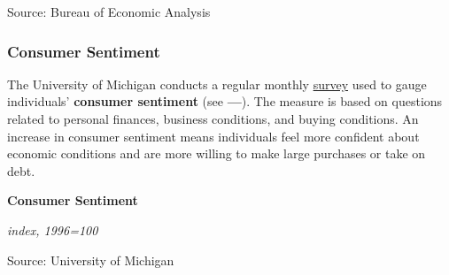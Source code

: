 \documentclass{report}
\makeatletter
\newcommand{\tbllink}[1]{\href{https://raw.githubusercontent.com/bdecon/US-chartbook/master/chartbook/data/#1}{\faTable}}
\newcommand*\short[1]{\expandafter\@gobbletwo\number\numexpr#1\relax}
\newcommand{\dateaxisticks}{
		date coordinates in=x, axis line style={draw=none},
		xmax={2020-08-10},
		max space between ticks=40,	    
		xtick={{1990-01-01}, {1992-01-01}, {1994-01-01}, 
			{1996-01-01}, {1998-01-01}, {2000-01-01}, 
			{2002-01-01}, {2004-01-01}, {2006-01-01},
			{2008-01-01}, {2010-01-01}, {2012-01-01}, {2014-01-01},
		    {2016-01-01}, {2018-01-01}, {2020-01-01}},
		minor xtick={{1989-01-01}, {1991-01-01}, {1993-01-01},
			{1995-01-01}, {1997-01-01}, {1999-01-01}, 
			{2001-01-01}, {2003-01-01}, {2005-01-01}, {2007-01-01},
		    {2009-01-01}, {2011-01-01}, {2013-01-01}, {2015-01-01},
		    {2017-01-01}, {2019-01-01}},
		enlarge y limits={0.06}, enlarge x limits={0.01},
		}
\newcommand{\bbar}[2]{extra #1 ticks = {{#2}}, extra #1 tick labels = ,
		extra #1 tick style = {grid=major, grid style={thick, black!25}},}
\newcommand{\stdline}[4]{\addplot[very thick, no markers, color=#1] 
		table [x=#2, y=#3, col sep=comma] {#4};	}
\newcommand{\rbars}{
		\fill[color=black!10] (axis cs:{1990-07-01},\pgfkeysvalueof{/pgfplots/ymin}) rectangle 
			(axis cs:{1991-03-01}, \pgfkeysvalueof{/pgfplots/ymax});
		\fill[color=black!10] (axis cs:{2007-12-01},\pgfkeysvalueof{/pgfplots/ymin}) rectangle 
			(axis cs:{2009-07-01}, \pgfkeysvalueof{/pgfplots/ymax});
		\fill[color=black!10] (axis cs:{2001-03-01},\pgfkeysvalueof{/pgfplots/ymin}) rectangle 
			(axis cs:{2001-11-01}, \pgfkeysvalueof{/pgfplots/ymax});
		\fill[color=black!10] (axis cs:{2020-02-01},\pgfkeysvalueof{/pgfplots/ymin}) rectangle 
			(axis cs:{2020-09-01}, \pgfkeysvalueof{/pgfplots/ymax});}
\makeatother
\begin{document}
{{{\begin{minipage}{0.76\textwidth}
\hspace*{-2mm} 

\footnotesize{Source: Bureau of Economic Analysis} \hfill \tbllink{psavert.csv}

\vspace{7mm}


\subsubsection*{\color{black!70} \seriffont Consumer Sentiment}

\small The University of Michigan conducts a regular monthly \href{http://www.sca.isr.umich.edu/}{survey} used to gauge individuals' \textbf{consumer sentiment} (see {\color{violet!60!blue}\textbf{---}}). The measure is based on questions related to personal finances, business conditions, and buying conditions. An increase in consumer sentiment means individuals feel more confident about economic conditions and are more willing to make large purchases or take on debt. 

\vspace{4mm}

\normalsize \textbf{Consumer Sentiment}

\footnotesize{\textit{index, 1996=100}}

\hspace*{-2mm} 

\footnotesize{Source: University of Michigan} \hfill \tbllink{umichsoc.csv}
\end{minipage}

}}}
\end{document}
